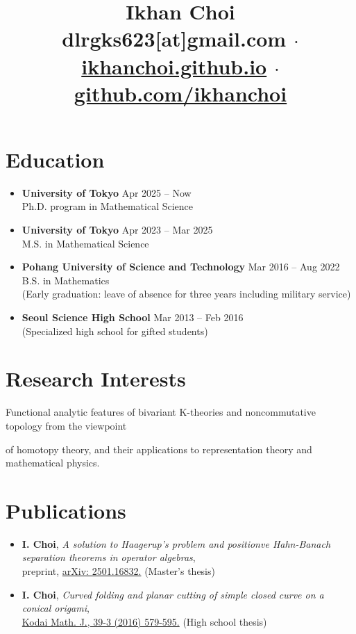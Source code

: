 \documentclass[11pt,a4paper]{article}
\title{\vspace{-40pt}
	Ikhan Choi\\[5pt]\small
	\faEnvelopeSquare\quad dlrgks623[at]gmail.com
	\quad$\cdot$\quad
	\faHome\quad\href{https://ikhanchoi.github.io}{ikhanchoi.github.io}
	\quad$\cdot$\quad
	\faGithub\quad\href{https://github.com/ikhanchoi}{github.com/ikhanchoi}
	\vspace{-5em}}
\date{}
\begin{document}
\maketitle

\section*{Education}
\begin{itemize}
\item
	\textbf{University of Tokyo}
	\hfill{\small Apr 2025 -- Now}\\
	Ph.D. program in Mathematical Science
\item
	\textbf{University of Tokyo}
	\hfill{\small Apr 2023 -- Mar 2025}\\
	M.S. in Mathematical Science
\item
	\textbf{Pohang University of Science and Technology}
	\hfill{\small Mar 2016 -- Aug 2022}\\
	B.S. in Mathematics\\
	(Early graduation: leave of absence for three years including military service)
\item
	\textbf{Seoul Science High School}
	\hfill{\small Mar 2013 -- Feb 2016}\\
	(Specialized high school for gifted students)
\end{itemize}



\section*{Research Interests}
\hspace{2em}
Functional analytic features of bivariant K-theories and noncommutative topology from the viewpoint\par\hspace{2em}
of homotopy theory, and their applications to representation theory and mathematical physics.



\section*{Publications}
\begin{itemize}
\item
	\textbf{I. Choi},
	\emph{A solution to Haagerup's problem and positionve Hahn-Banach separation theorems in operator algebras},\\
	preprint, \href{https://arxiv.org/abs/2501.16832}{arXiv: 2501.16832.} (Master's thesis)
\item
	\textbf{I. Choi},
	\emph{Curved folding and planar cutting of simple closed curve on a conical origami},\\
	\href{https://projecteuclid.org/journals/kodai-mathematical-journal/volume-39/issue-3/Curved-folding-and-planar-cutting-of-simple-closed-curve-on/10.2996/kmj/1478073774.full}{Kodai Math. J., 39-3 (2016) 579-595.} (High school thesis)
\end{itemize}
\end{document}
